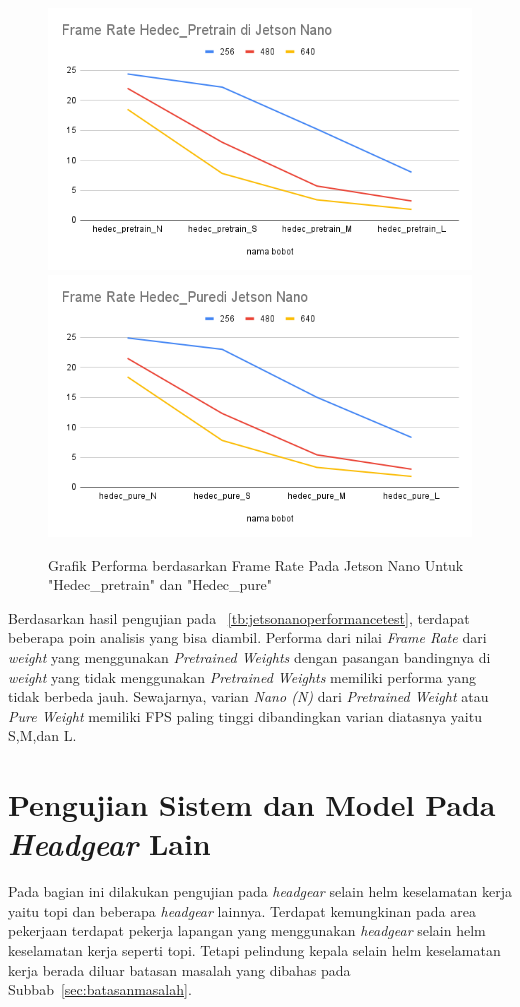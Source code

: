\begin{figure} [h!]
  \centering
  \includegraphics[width=.45\textwidth]{gambar/performance_jetson/Frame Rate Hedec_Pretrain di Jetson Nano.png}
  \includegraphics[width=.45\textwidth]{gambar/performance_jetson/Frame Rate Hedec_Puredi Jetson Nano.png}
  \caption{Grafik Performa berdasarkan Frame Rate Pada Jetson Nano Untuk "Hedec\_pretrain" dan "Hedec\_pure"}
  \label{fig:graf_jetsonano}  
\end{figure}

\FloatBarrier

\par Berdasarkan hasil pengujian pada ~\ref{tb:jetsonanoperformancetest}, terdapat beberapa poin analisis yang bisa diambil.
Performa dari nilai \emph{Frame Rate} dari \emph{weight} yang menggunakan \emph{Pretrained Weights} dengan pasangan bandingnya di \emph{weight}
yang tidak menggunakan \emph{Pretrained Weights} memiliki performa yang tidak berbeda jauh. Sewajarnya, varian \emph{Nano (N)} dari
\emph{Pretrained Weight} atau \emph{Pure Weight} memiliki FPS paling tinggi dibandingkan varian diatasnya yaitu S,M,dan L.

\section{Pengujian Sistem dan Model Pada \emph{Headgear} Lain}
\label{sec:otherheadgear_test}

\par Pada bagian ini dilakukan pengujian pada \emph{headgear} selain helm keselamatan kerja yaitu topi dan beberapa \emph{headgear} lainnya. Terdapat kemungkinan pada area pekerjaan terdapat pekerja lapangan yang menggunakan \emph{headgear} selain helm keselamatan kerja seperti topi. Tetapi pelindung kepala selain helm keselamatan kerja berada diluar batasan masalah yang dibahas pada Subbab~\ref{sec:batasanmasalah}.

